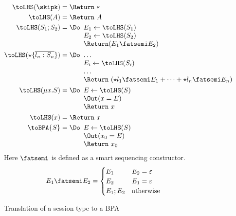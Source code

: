 \begin{figure}[tp]
    \begin{align*}
      \toLHS (\skipk) & = \Return\ \varepsilon \\
      \toLHS (A) & = \Return\ A \\
      \toLHS (S_1; S_2) & = \Do
                              \begin{array}[t]{l}
                                E_1 \gets \toLHS (S_1) \\
                                E_2 \gets \toLHS (S_2) \\
                                \Return (E_1\fatsemi E_2)
                              \end{array}
      \\
      \toLHS (\star\{\overline{l_n:S_n}\}) &= \Do
                                                 \begin{array}[t]{l}
                                                   \dots \\
                                                   E_i \gets \toLHS (S_i) \\
                                                   \dots \\
                                                   \Return\ (\star l_1\fatsemi E_1 + \dots + \star l_n\fatsemi E_n)
                                                 \end{array}
      \\
      \toLHS (\mu x.S) &= \Do
                             \begin{array}[t]{l}
                               E \gets \toLHS (S) \\
                               \Out (x = E) \\
                               \Return\ x
                             \end{array}
      \\
      \toLHS (x) &= \Return\ x
      \\
      \toBPA{S} &= \Do
                   \begin{array}[t]{l}
                     E \gets \toLHS (S) \\
                     \Out (x_0 = E) \\
                     \Return\ x_0
                   \end{array}
    \end{align*}
    Here $\fatsemi$ is defined as a smart sequencing constructor.
    \begin{align*}
      E_1 \fatsemi E_2 &=
                         \begin{cases}
                           E_1 & E_2=\varepsilon \\
                           E_2 & E_1=\varepsilon \\
                           E_1;E_2 & \text{otherwise}
                         \end{cases}
    \end{align*}
    \caption{Translation of a session type to a BPA}
    \label{fig:session-to-bpa}
  \end{figure}

